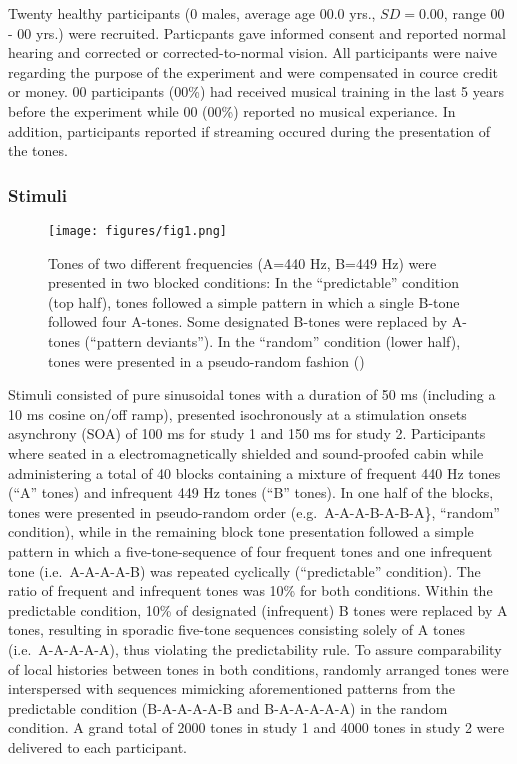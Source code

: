 \documentclass[stu,a4paper,11pt,floatsintext]{apa7}
\renewcommand{\includegraphics}[1]{
	\latexincludegraphics[width = \textwidth]{#1}
}
\begin{document}
Twenty healthy participants (0 males, average age 00.0 yrs.,
\(SD=0.00\), range 00 - 00 yrs.) were recruited. Particpants gave
informed consent and reported normal hearing and corrected or
corrected-to-normal vision. All participants were naive regarding the
purpose of the experiment and were compensated in cource credit or
money. 00 participants (00\%) had received musical training in the last
5 years before the experiment while 00 (00\%) reported no musical
experiance. In addition, participants reported if streaming occured
during the presentation of the tones.

\hypertarget{stimuli}{%
\subsubsection{Stimuli}\label{stimuli}}

\begin{figure}
\centering
\texttt{[image: figures/fig1.png]}
\caption{Tones of two different frequencies (A=440 Hz, B=449 Hz) were
presented in two blocked conditions: In the \enquote{predictable}
condition (top half), tones followed a simple pattern in which a single
B-tone followed four A-tones. Some designated B-tones were replaced by
A-tones (\enquote{pattern deviants}). In the \enquote{random} condition
(lower half), tones were presented in a pseudo-random fashion ()}
\end{figure}

Stimuli consisted of pure sinusoidal tones with a duration of 50 ms
(including a 10 ms cosine on/off ramp), presented isochronously at a
stimulation onsets asynchrony (SOA) of 100 ms for study 1 and 150 ms for
study 2. Participants where seated in a electromagnetically shielded and
sound-proofed cabin while administering a total of 40 blocks containing
a mixture of frequent 440 Hz tones (\enquote{A} tones) and infrequent
449 Hz tones (\enquote{B} tones). In one half of the blocks, tones were
presented in pseudo-random order (e.g.~A-A-A-B-A-B-A\}, \enquote{random}
condition), while in the remaining block tone presentation followed a
simple pattern in which a five-tone-sequence of four frequent tones and
one infrequent tone (i.e.~A-A-A-A-B) was repeated cyclically
(\enquote{predictable} condition). The ratio of frequent and infrequent
tones was 10\% for both conditions. Within the predictable condition,
10\% of designated (infrequent) B tones were replaced by A tones,
resulting in sporadic five-tone sequences consisting solely of A tones
(i.e.~A-A-A-A-A), thus violating the predictability rule. To assure
comparability of local histories between tones in both conditions,
randomly arranged tones were interspersed with sequences mimicking
aforementioned patterns from the predictable condition (B-A-A-A-A-B and
B-A-A-A-A-A) in the random condition. A grand total of 2000 tones in
study 1 and 4000 tones in study 2 were delivered to each participant.
\end{document}
